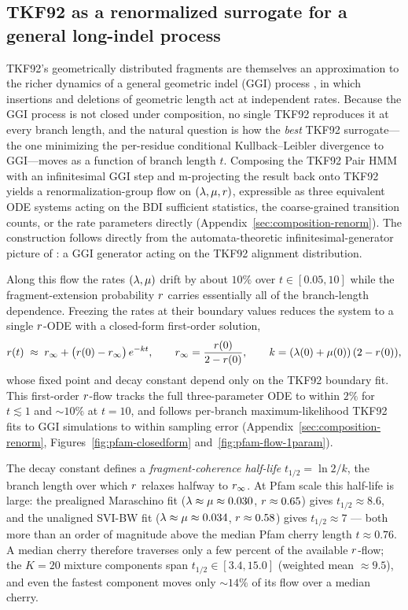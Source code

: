 \subsection{TKF92 as a renormalized surrogate for a general long-indel process}
\label{sec:results-ggi-flow}

TKF92's geometrically distributed fragments are themselves an
approximation to the richer dynamics of a general geometric indel
(GGI) process \cite{Holmes2020}, in which insertions and deletions of
geometric length act at independent rates.  Because the GGI process is
not closed under composition, no single TKF92 reproduces it at every
branch length, and the natural question is how the \emph{best} TKF92
surrogate---the one minimizing the per-residue conditional
Kullback--Leibler divergence to GGI---moves as a function of branch
length $t$.  Composing the TKF92 Pair HMM with an infinitesimal GGI
step and m-projecting the result back onto TKF92 yields a
renormalization-group flow on $(\lambda, \mu, r)$, expressible
as three equivalent ODE systems acting on the BDI sufficient
statistics, the coarse-grained transition counts, or the rate
parameters directly (Appendix~\ref{sec:composition-renorm}).  The
construction follows directly from the automata-theoretic
infinitesimal-generator picture of \cite{Holmes2020}: a GGI generator
acting on the TKF92 alignment distribution.

Along this flow the rates $(\lambda, \mu)$ drift by about $10\%$
over $t \in [0.05, 10]$ while the fragment-extension probability $r$
carries essentially all of the branch-length dependence.  Freezing the
rates at their boundary values reduces the system to a single
$r$-ODE with a closed-form first-order solution,
\begin{equation*}
r(t) \;\approx\; r_\infty + \bigl(r(0) - r_\infty\bigr)\,
e^{-kt},
\qquad
r_\infty = \frac{r(0)}{2 - r(0)},
\qquad
k = (\lambda(0) + \mu(0))\,(2 - r(0)),
\end{equation*}
whose fixed point and decay constant depend only on the TKF92 boundary
fit.  This first-order $r$-flow tracks the full three-parameter ODE
to within $2\%$ for $t \lesssim 1$ and $\sim 10\%$ at $t = 10$, and
follows per-branch maximum-likelihood TKF92 fits to GGI simulations to
within sampling error (Appendix~\ref{sec:composition-renorm},
Figures~\ref{fig:pfam-closedform} and~\ref{fig:pfam-flow-1param}).

The decay constant defines a \emph{fragment-coherence half-life}
$t_{1/2} = \ln 2 / k$, the branch length over which $r$ relaxes
halfway to $r_\infty$.  At Pfam scale this half-life is large: the
prealigned Maraschino fit ($\lambda \approx \mu \approx 0.030$,
$r \approx 0.65$) gives $t_{1/2} \approx 8.6$, and the unaligned
SVI-BW fit ($\lambda \approx \mu \approx 0.034$, $r \approx
0.58$) gives $t_{1/2} \approx 7$ --- both more than an order of
magnitude above the median Pfam cherry length $t \approx 0.76$.  A
median cherry therefore traverses only a few percent of the available
$r$-flow; the $K = 20$ mixture components span $t_{1/2} \in [3.4,
15.0]$ (weighted mean $\approx 9.5$), and even the fastest component
moves only $\sim 14\%$ of its flow over a median cherry.

